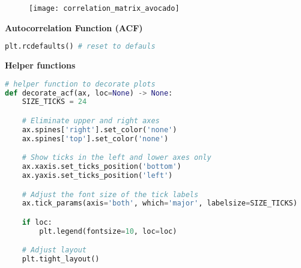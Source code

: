 \begin{figure}[h!]
  \centering
  \texttt{[image: correlation\_matrix\_avocado]}
\end{figure}


\begin{center}
  \noindent\normalsize\bfseries
  Autocorrelation Function (ACF)
\end{center}\vspace{-17.5pt}

\begin{center}
  \begin{lstlisting}[language=Python]
plt.rcdefaults() # reset to defauls
  \end{lstlisting}
\end{center}

{\noindent\hspace{-12.5pt}\normalsize\bfseries Helper functions}\vspace{-10pt}
\begin{center}
  \begin{lstlisting}[language=Python]
# helper function to decorate plots
def decorate_acf(ax, loc=None) -> None:
    SIZE_TICKS = 24

    # Eliminate upper and right axes
    ax.spines['right'].set_color('none')
    ax.spines['top'].set_color('none')

    # Show ticks in the left and lower axes only
    ax.xaxis.set_ticks_position('bottom')
    ax.yaxis.set_ticks_position('left')

    # Adjust the font size of the tick labels
    ax.tick_params(axis='both', which='major', labelsize=SIZE_TICKS)

    if loc:
        plt.legend(fontsize=10, loc=loc)

    # Adjust layout
    plt.tight_layout()
  \end{lstlisting}
\end{center}


